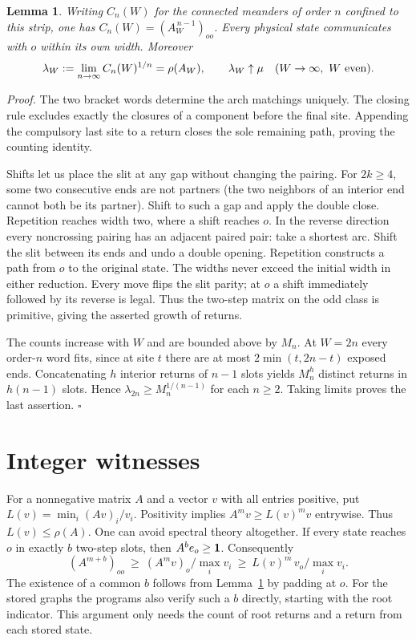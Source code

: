 \documentclass[11pt]{article}
\newenvironment{proof}{\par\noindent\textit{Proof.} }{\unskip\nobreak\hfill\hbox{$\square$}\par}
\newtheorem{lemma}[theorem]{Lemma}
\begin{document}
\begin{lemma}\label{strip}
Writing \(C_n(W)\) for the connected meanders of order \(n\) confined to this strip, one has \(C_n(W)=(A_W^{\,n-1})_{oo}\). Every physical state communicates with \(o\) within its own width. Moreover
\[
 \lambda_W:=\lim_{n\to\infty} C_n(W)^{1/n}=\rho(A_W),\qquad
        \lambda_W\uparrow\mu\quad (W\to\infty,\ W\ {\rm even}).
\]
\end{lemma}
\begin{proof}
The two bracket words determine the arch matchings uniquely. The closing rule excludes exactly the closures of a component before the final site. Appending the compulsory last site to a return closes the sole remaining path, proving the counting identity.

Shifts let us place the slit at any gap without changing the pairing. For \(2k\ge4\), some two consecutive ends are not partners (the two neighbors of an interior end cannot both be its partner). Shift to such a gap and apply the double close. Repetition reaches width two, where a shift reaches \(o\). In the reverse direction every noncrossing pairing has an adjacent paired pair: take a shortest arc. Shift the slit between its ends and undo a double opening. Repetition constructs a path from \(o\) to the original state. The widths never exceed the initial width in either reduction. Every move flips the slit parity; at \(o\) a shift immediately followed by its reverse is legal. Thus the two-step matrix on the odd class is primitive, giving the asserted growth of returns.

The counts increase with \(W\) and are bounded above by \(M_n\). At \(W=2n\) every order-\(n\) word fits, since at site \(t\) there are at most \(2\min(t,2n-t)\) exposed ends. Concatenating \(h\) interior returns of \(n-1\) slots yields \(M_n^h\) distinct returns in \(h(n-1)\) slots. Hence \(\lambda_{2n}\ge M_n^{1/(n-1)}\) for each \(n\ge2\). Taking limits proves the last assertion.
\end{proof}

\newpage
\section{Integer witnesses}
For a nonnegative matrix \(A\) and a vector \(v\) with all entries positive, put \(L(v)=\min_i(Av)_i/v_i\). Positivity implies \(A^m v\ge L(v)^m v\) entrywise. Thus \(L(v)\le\rho(A)\). One can avoid spectral theory altogether. If every state reaches \(o\) in exactly \(b\) two-step slots, then \(A^b e_o\ge{\bf1}\). Consequently
\[
 (A^{m+b})_{oo}\ \ge\ (A^m v)_o/\max_i v_i
             \ \ge\ L(v)^m\,v_o/\max_i v_i .
\]
The existence of a common \(b\) follows from Lemma~\ref{strip} by padding at \(o\). For the stored graphs the programs also verify such a \(b\) directly, starting with the root indicator. This argument only needs the count of root returns and a return from each stored state.
\end{document}
